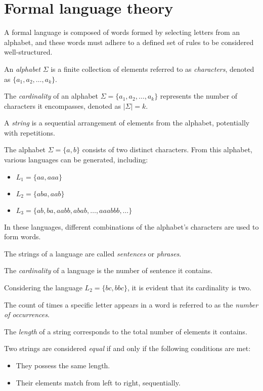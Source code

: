 \section{Formal language theory}

A formal language is composed of words formed by selecting letters from an alphabet, and these words must adhere to a defined set of rules to be considered well-structured.
\begin{definition}
    An \emph{alphabet} $\Sigma$ is a finite collection of elements referred to as \emph{characters}, denoted as $\{ a_1,a_2,\dots, a_k \}$. 

    The \emph{cardinality} of an alphabet $\Sigma =\{ a_1,a_2,\dots, a_k \}$ represents the number of characters it encompasses, denoted as $\left\lvert \Sigma \right\rvert = k$. 

    A \emph{string} is a sequential arrangement of elements from the alphabet, potentially with repetitions.
\end{definition}
\begin{example}
    The alphabet $\Sigma =\{ a,b \}$ consists of two distinct characters.
    From this alphabet, various languages can be generated, including:
    \begin{itemize}
        \item $L_1=\{aa,aaa\}$
        \item $L_2=\{aba,aab\}$
        \item $L_3=\{ab,ba,aabb,abab,\dots,aaabbb,\dots\}$
    \end{itemize}
    In these languages, different combinations of the alphabet's characters are used to form words.
\end{example}
\begin{definition}
    The strings of a language are called \emph{sentences} or \emph{phrases}. 
    
    The \emph{cardinality} of a language is the number of sentence it contains.
\end{definition}
\begin{example}
    Considering the language $L_2=\{ bc,bbc \}$, it is evident that its cardinality is two.
\end{example}
\newpage
\begin{definition}
    The count of times a specific letter appears in a word is referred to as the \emph{number of occurrences}. 
    
    The \emph{length} of a string corresponds to the total number of elements it contains.

    Two strings are considered  \emph{equal} if and only if the following conditions are met:
    \begin{itemize}
        \item They possess the same length.
        \item Their elements match from left to right, sequentially.
    \end{itemize}
\end{definition}
